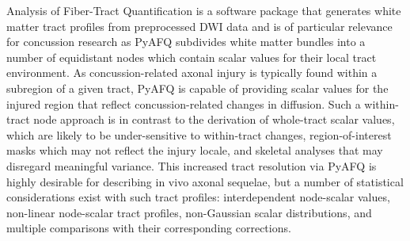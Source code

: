 \documentclass[12pt]{article}
\begin{document}
Analysis of Fiber-Tract Quantification \parencite[PyAFQ;][]{yeatman2012TractProfilesWhite,kruper2021EvaluatingReliabilityHuman,kruper2024TractometryHumanConnectome} is a software package that generates white matter tract profiles from preprocessed DWI data and is of particular relevance for concussion research as PyAFQ subdivides white matter bundles into a number of equidistant nodes which contain scalar values for their local tract environment. As concussion-related axonal injury is typically found within a subregion of a given tract, PyAFQ is capable of providing scalar values for the injured region that reflect concussion-related changes in diffusion. Such a within-tract node approach is in contrast to the derivation of whole-tract scalar values, which are likely to be under-sensitive to within-tract changes, region-of-interest masks which may not reflect the injury locale, and skeletal analyses that may disregard meaningful variance. This increased tract resolution via PyAFQ is highly desirable for describing in vivo axonal sequelae, but a number of statistical considerations exist with such tract profiles: interdependent node-scalar values, non-linear node-scalar tract profiles, non-Gaussian scalar distributions, and multiple comparisons with their corresponding corrections.
\end{document}
